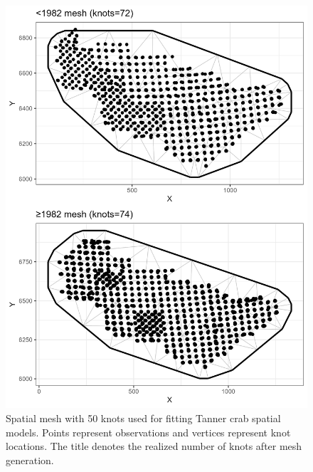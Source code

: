 \documentclass[
]{article}
\begin{document}
\begin{figure}

{\centering \includegraphics[width=6in]{../BAIRDI/Figures/mesh50} 

}

\caption{Spatial mesh with 50 knots used for fitting Tanner crab spatial models. Points represent observations and vertices represent knot locations. The title denotes the realized number of knots after mesh generation. }\label{fig:bairdi-50-mesh}
\end{figure}
\end{document}

